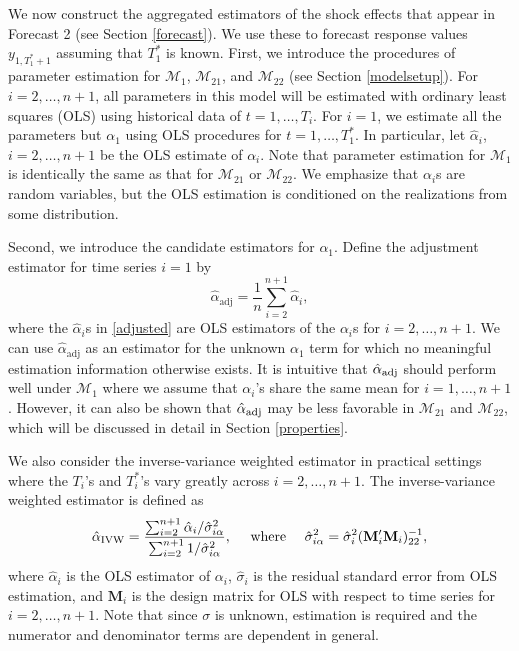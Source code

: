 \documentclass[11pt,3p,review,authoryear]{elsarticle}
\def\mbf#1{\mathbf{#1}} %
\def\mc#1{\mathcal{#1}} %
\theoremstyle{definition}
\begin{document}
We now construct the aggregated estimators of the shock effects that appear in Forecast 2 (see Section \ref{forecast}). We use these to forecast response values $y_{1, T_1^*+1}$ assuming that $T_1^*$ is known.  First, we introduce the procedures of parameter estimation for $\mc{M}_1$, $\mc{M}_{21}$, and $\mc{M}_{22}$ (see Section \ref{modelsetup}). For $i = 2, \ldots, n+1$, all parameters in this model will be estimated with ordinary least squares (OLS) using historical data of $t = 1, \ldots, T_i$. For $i = 1$, we estimate all the parameters but $\alpha_1$ using OLS procedures for $t=1, \ldots, T_1^*$. In particular, let $\hat{\alpha}_i$, $i = 2, \ldots, n+1$ be the OLS estimate of $\alpha_i$.  Note that parameter estimation for $\mc{M}_1$ is identically the same as that for $\mc{M}_{21}$ or $\mc{M}_{22}$.  We emphasize that $\alpha_i$s are random variables, but the OLS estimation is conditioned on the realizations from some distribution.


Second, we introduce the candidate estimators for $\alpha_1$. Define the 
adjustment estimator for time series $i=1$ by
\begin{equation} \label{adjusted}
  \hat{\alpha}_{\text{adj}} = \frac{1}{n}\sum_{i=2}^{n+1}\hat{\alpha}_i,
\end{equation}
where the $\hat{\alpha}_i$s in \eqref{adjusted} are OLS estimators of  
the $\alpha_i$s for $i = 2, \ldots, n+1$.  We can use $\hat{\alpha}_{\text{adj}}$ as an estimator for 
the unknown $\alpha_1$ term for which no meaningful estimation information 
otherwise exists. It is intuitive that $\hat{\alpha}_{\rm adj}$ should perform 
well under $\mc{M}_1$ where we assume that $\alpha_i$'s share the same mean 
for $i= 1, \ldots, n+1$. However, it can also be shown that 
$\hat{\alpha}_{\rm adj}$ may be less favorable in $\mc{M}_{21}$ 
and $\mc{M}_{22}$, which will be discussed in detail in Section \ref{properties}. 

We also consider the inverse-variance weighted estimator 
in practical settings where the $T_i$'s and $T_i^*$'s vary greatly across $i=2, \ldots, n+1$. 
The inverse-variance weighted estimator is defined as 
\begin{align*}
  \hat{\alpha}_{\rm IVW} = \frac{\sum_{i=2}^{n+1} \hat{\alpha}_i / \hat{\sigma}_{i\alpha}^2}{\sum_{i=2}^{n+1} 1/\hat{\sigma}_{i\alpha}^2},
  \quad \text{ where } \quad  \hat{\sigma}_{i\alpha}^2 = \hat{\sigma}^2_i( \mathbf{M}_i'\mbf{M}_i)_{22}^{-1},
\end{align*}
where  $\hat{\alpha}_i$ is the OLS estimator of $\alpha_i$, 
$\hat{\sigma}_i$ is the residual standard error from OLS estimation, 
and $\mbf{M}_i$ is the design matrix for OLS with respect to time series 
for $i = 2, \ldots, n+1$. Note that since $\sigma$ is unknown, estimation 
is required and the numerator and denominator terms are dependent in general. 
\end{document}
